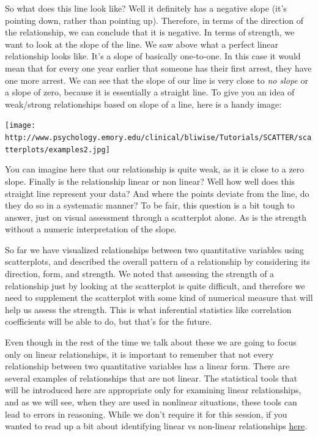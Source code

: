 \documentclass[
]{book}
\begin{document}
So what does this line look like? Well it definitely has a negative slope (it's pointing down, rather than pointing up). Therefore, in terms of the direction of the relationship, we can conclude that it is negative. In terms of strength, we want to look at the slope of the line. We saw above what a perfect linear relationship looks like. It's a slope of basically one-to-one. In this case it would mean that for every one year earlier that someone has their first arrest, they have one more arrest. We can see that the slope of our line is very close to \emph{no slope} or a slope of zero, because it is essentially a straight line. To give you an idea of weak/strong relationships based on slope of a line, here is a handy image:

\texttt{[image: http://www.psychology.emory.edu/clinical/bliwise/Tutorials/SCATTER/scatterplots/examples2.jpg]}

You can imagine here that our relationship is quite weak, as it is close to a zero slope. Finally is the relationship linear or non linear? Well how well does this straight line represent your data? And where the points deviate from the line, do they do so in a systematic manner? To be fair, this question is a bit tough to answer, just on visual assessment through a scatterplot alone. As is the strength without a numeric interpretation of the slope.

So far we have visualized relationships between two quantitative variables using scatterplots, and described the overall pattern of a relationship by considering its direction, form, and strength. We noted that assessing the strength of a relationship just by looking at the scatterplot is quite difficult, and therefore we need to supplement the scatterplot with some kind of numerical measure that will help us assess the strength. This is what inferential statistics like correlation coefficients will be able to do, but that's for the future.

Even though in the rest of the time we talk about these we are going to focus only on linear relationships, it is important to remember that not every relationship between two quantitative variables has a linear form. There are several examples of relationships that are not linear. The statistical tools that will be introduced here are appropriate only for examining linear relationships, and as we will see, when they are used in nonlinear situations, these tools can lead to errors in reasoning. While we don't require it for this session, if you wanted to read up a bit about identifying linear vs non-linear relationships \href{http://blog.minitab.com/blog/adventures-in-statistics-2/linear-or-nonlinear-regression-that-is-the-question}{here}.
\end{document}
